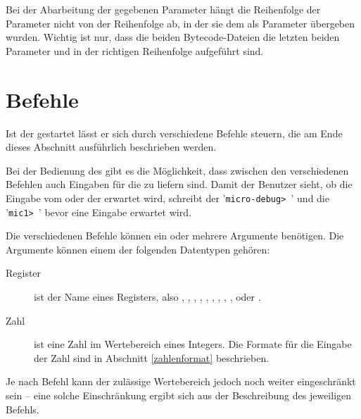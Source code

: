 Bei der Abarbeitung der gegebenen Parameter hängt die Reihenfolge der Parameter nicht von der Reihenfolge ab, in der sie dem \md{} als Parameter übergeben wurden. Wichtig ist nur, dass die beiden Bytecode-Dateien die letzten beiden Parameter und in der richtigen Reihenfolge aufgeführt sind.

\section{Befehle}
Ist der \md{} gestartet lässt er sich durch verschiedene Befehle steuern, die am Ende dieses Abschnitt ausführlich beschrieben werden.

Bei der Bedienung des \md{} gibt es die Möglichkeit, dass zwischen den verschiedenen Befehlen auch Eingaben für die \mic{} zu liefern sind. Damit der Benutzer sieht, ob die Eingabe vom \md{} oder der \mic{} erwartet wird, schreibt der \md{} '\texttt{micro-debug> }' und die \mic{} '\texttt{mic1> }' bevor eine Eingabe erwartet wird.

Die verschiedenen Befehle können ein oder mehrere Argumente benötigen. Die Argumente können einem der folgenden Datentypen gehören:
\begin{description}
\item[Register] ist der Name eines Registers, also , , , , , , , , ,  oder .
\item[Zahl] ist eine Zahl im Wertebereich eines Integers. Die Formate für die Eingabe der Zahl sind in Abschnitt \ref{zahlenformat} beschrieben.
\end{description}

Je nach Befehl kann der zulässige Wertebereich jedoch noch weiter eingeschränkt sein -- eine solche Einschränkung ergibt sich aus der Beschreibung des jeweiligen Befehls.

